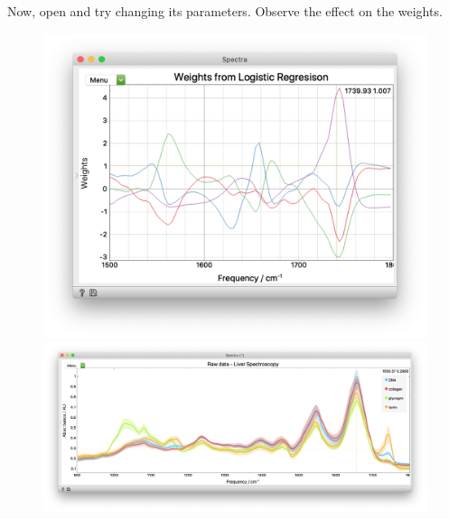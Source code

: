 Now, open  and try changing its parameters. Observe the effect on the weights.

\begin{figure}[h]
\hspace{-1cm}
  {\includegraphics[scale=0.35]{sp_classification-fig5a.png}}
  {\includegraphics[scale=0.35]{sp_classification-fig5b.png}}
  \label{fig:spectra_classification-fig5}
\end{figure}
